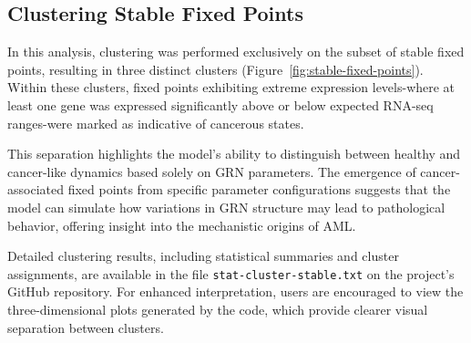 \documentclass[a4paper,12pt]{article}
\begin{document}
\subsection{Clustering Stable Fixed Points}
In this analysis, clustering was performed exclusively on the subset of stable fixed points, resulting in three distinct clusters (Figure~\ref{fig:stable-fixed-points}). Within these clusters, fixed points exhibiting extreme expression levels-where at least one gene was expressed significantly above or below expected RNA-seq ranges-were marked as indicative of cancerous states.

This separation highlights the model’s ability to distinguish between healthy and cancer-like dynamics based solely on GRN parameters. The emergence of cancer-associated fixed points from specific parameter configurations suggests that the model can simulate how variations in GRN structure may lead to pathological behavior, offering insight into the mechanistic origins of AML.

Detailed clustering results, including statistical summaries and cluster assignments, are available in the file \texttt{stat-cluster-stable.txt} on the project’s GitHub repository. For enhanced interpretation, users are encouraged to view the three-dimensional plots generated by the code, which provide clearer visual separation between clusters.
\end{document}
